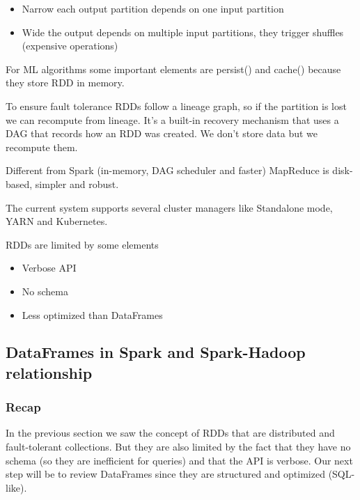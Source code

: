 \begin{itemize}
    \item Narrow \ra each output partition depends on one input partition
    \item Wide \ra the output depends on multiple input partitions, they trigger shuffles (expensive operations)
\end{itemize}


For ML algorithms some important elements are persist() and cache() because they store RDD in memory. 

\vspace{10pt}

To ensure fault tolerance RDDs follow a lineage graph, so if the partition is lost we can recompute from lineage. It's a built-in recovery mechanism that uses a DAG that records how an RDD was created. We don't store data but we recompute them.

\vspace{10pt}

Different from Spark (in-memory, DAG scheduler and faster) MapReduce is disk-based, simpler and robust.

\vspace{10pt}

The current system supports several cluster managers like Standalone mode, YARN and Kubernetes.

\vspace{10pt}

RDDs are limited by some elements 
\begin{itemize}
    \item Verbose API
    \item No schema
    \item Less optimized than DataFrames
\end{itemize}

\subsection{DataFrames in Spark and Spark-Hadoop relationship}


\subsubsection{Recap}

In the previous section we saw the concept of RDDs that are distributed and fault-tolerant collections. But they are also limited by the fact that they have no schema (so they are inefficient for queries) and that the API is verbose. Our next step will be to review DataFrames since they are structured and optimized (SQL-like).

